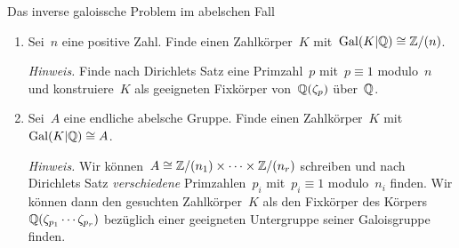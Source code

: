 \documentclass[entwurf]{uebblatt}
\begin{document}

\begin{aufgabe}{Das inverse galoissche Problem im abelschen Fall}
\begin{enumerate}
\item Sei~$n$ eine positive Zahl. Finde einen Zahlkörper~$K$
mit~$\mathrm{Gal}(K|\mathbb{Q}) \cong \mathbb{Z}/(n)$.

{\tiny\emph{Hinweis.} Finde nach Dirichlets Satz eine Primzahl~$p$ mit~$p
\equiv 1$ modulo~$n$ und konstruiere~$K$ als geeigneten Fixkörper
von~$\mathbb{Q}(\zeta_p)$ über~$\mathbb{Q}$.\par}

\item Sei~$A$ eine endliche abelsche Gruppe. Finde einen Zahlkörper~$K$
mit~$\mathrm{Gal}(K|\mathbb{Q}) \cong A$.

{\tiny\emph{Hinweis.} Wir können~$A \cong \mathbb{Z}/(n_1) \times \cdots \times
\mathbb{Z}/(n_r)$ schreiben und nach Dirichlets Satz \emph{verschiedene}
Primzahlen~$p_i$ mit~$p_i \equiv 1$ modulo~$n_i$ finden. Wir können dann den
gesuchten Zahlkörper~$K$ als den Fixkörper
des Körpers~$\mathbb{Q}(\zeta_{p_1}\cdots\zeta_{p_r})$ bezüglich einer geeigneten Untergruppe
seiner Galoisgruppe finden.\par}
\end{enumerate}
\end{aufgabe}
\end{document}
